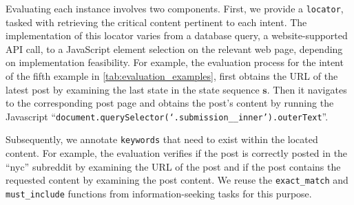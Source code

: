 \documentclass{article}
\begin{document}
Evaluating each instance involves two components. First, we provide a \texttt{locator}, tasked with retrieving the critical content pertinent to each intent. 
The implementation of this locator varies from a database query, a website-supported API call, to a JavaScript element selection on the relevant web page, depending on implementation feasibility.
For example, the evaluation process for the intent of the fifth example in \autoref{tab:evaluation_examples}, first obtains the URL of the latest post by examining the last state in the state sequence $\mathbf{s}$. Then it navigates to the corresponding post page and obtains the post's content by running the Javascript {\small ``\texttt{document.querySelector(`.submission\_\_inner').outerText}''}.

Subsequently, we annotate \texttt{keywords} that need to exist within the located content. For example, the evaluation verifies if the post is correctly posted in the ``nyc'' subreddit by examining the URL of the post and if the post contains the requested content by examining the post content.
We reuse the \texttt{exact\_match} and \texttt{must\_include} functions from information-seeking tasks for this purpose.
\end{document}
